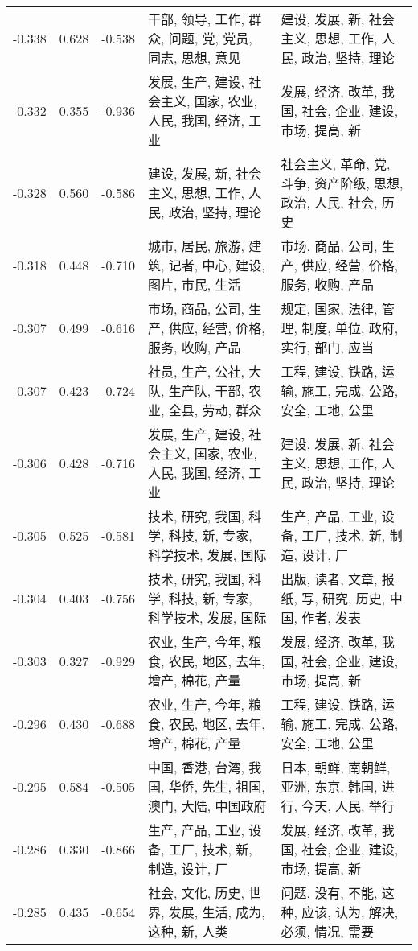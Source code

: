 \begin{tabular}{cccp{5cm}p{5cm}}
-0.338 & 0.628 & -0.538 & 干部, 领导, 工作, 群众, 问题, 党, 党员, 同志, 思想, 意见 & 建设, 发展, 新, 社会主义, 思想, 工作, 人民, 政治, 坚持, 理论 \\
-0.332 & 0.355 & -0.936 & 发展, 生产, 建设, 社会主义, 国家, 农业, 人民, 我国, 经济, 工业 & 发展, 经济, 改革, 我国, 社会, 企业, 建设, 市场, 提高, 新 \\
-0.328 & 0.560 & -0.586 & 建设, 发展, 新, 社会主义, 思想, 工作, 人民, 政治, 坚持, 理论 & 社会主义, 革命, 党, 斗争, 资产阶级, 思想, 政治, 人民, 社会, 历史 \\
-0.318 & 0.448 & -0.710 & 城市, 居民, 旅游, 建筑, 记者, 中心, 建设, 图片, 市民, 生活 & 市场, 商品, 公司, 生产, 供应, 经营, 价格, 服务, 收购, 产品 \\
-0.307 & 0.499 & -0.616 & 市场, 商品, 公司, 生产, 供应, 经营, 价格, 服务, 收购, 产品 & 规定, 国家, 法律, 管理, 制度, 单位, 政府, 实行, 部门, 应当 \\
-0.307 & 0.423 & -0.724 & 社员, 生产, 公社, 大队, 生产队, 干部, 农业, 全县, 劳动, 群众 & 工程, 建设, 铁路, 运输, 施工, 完成, 公路, 安全, 工地, 公里 \\
-0.306 & 0.428 & -0.716 & 发展, 生产, 建设, 社会主义, 国家, 农业, 人民, 我国, 经济, 工业 & 建设, 发展, 新, 社会主义, 思想, 工作, 人民, 政治, 坚持, 理论 \\
-0.305 & 0.525 & -0.581 & 技术, 研究, 我国, 科学, 科技, 新, 专家, 科学技术, 发展, 国际 & 生产, 产品, 工业, 设备, 工厂, 技术, 新, 制造, 设计, 厂 \\
-0.304 & 0.403 & -0.756 & 技术, 研究, 我国, 科学, 科技, 新, 专家, 科学技术, 发展, 国际 & 出版, 读者, 文章, 报纸, 写, 研究, 历史, 中国, 作者, 发表 \\
-0.303 & 0.327 & -0.929 & 农业, 生产, 今年, 粮食, 农民, 地区, 去年, 增产, 棉花, 产量 & 发展, 经济, 改革, 我国, 社会, 企业, 建设, 市场, 提高, 新 \\
-0.296 & 0.430 & -0.688 & 农业, 生产, 今年, 粮食, 农民, 地区, 去年, 增产, 棉花, 产量 & 工程, 建设, 铁路, 运输, 施工, 完成, 公路, 安全, 工地, 公里 \\
-0.295 & 0.584 & -0.505 & 中国, 香港, 台湾, 我国, 华侨, 先生, 祖国, 澳门, 大陆, 中国政府 & 日本, 朝鲜, 南朝鲜, 亚洲, 东京, 韩国, 进行, 今天, 人民, 举行 \\
-0.286 & 0.330 & -0.866 & 生产, 产品, 工业, 设备, 工厂, 技术, 新, 制造, 设计, 厂 & 发展, 经济, 改革, 我国, 社会, 企业, 建设, 市场, 提高, 新 \\
-0.285 & 0.435 & -0.654 & 社会, 文化, 历史, 世界, 发展, 生活, 成为, 这种, 新, 人类 & 问题, 没有, 不能, 这种, 应该, 认为, 解决, 必须, 情况, 需要 \\

\end{tabular}
